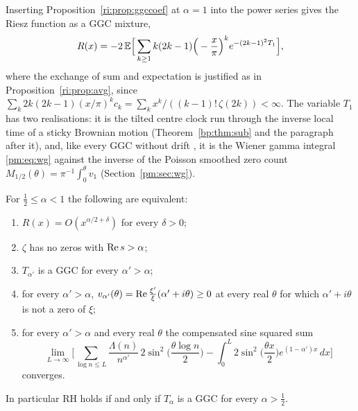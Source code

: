 Inserting Proposition~\ref{ri:prop:ggccoef} at $\alpha=1$ into the power series gives the Riesz function as a GGC mixture,
\begin{equation}\label{ri:eq:mixture}
R(x)=-2\,\mathbb{E}\Big[\sum_{k\ge1}k(2k-1)\Big(-\frac x\pi\Big)^ke^{-(2k-1)^2T_1}\Big],
\end{equation}
where the exchange of sum and expectation is justified as in Proposition~\ref{ri:prop:avg}, since $\sum_k2k(2k-1)(x/\pi)^kc_k=\sum_kx^k/((k-1)!\,\zeta(2k))<\infty$. The variable $T_1$ has two realisations: it is the tilted centre clock run through the inverse local time of a sticky Brownian motion (Theorem~\ref{bp:thm:sub} and the paragraph after it), and, like every GGC without drift \cite{JRY}, it is the Wiener gamma integral \eqref{pm:eq:wg} against the inverse of the Poisson smoothed zero count $M_{1/2}(\theta)=\pi^{-1}\int_0^\theta v_1$ (Section~\ref{pm:sec:wg}).

\begin{theorem}\label{ri:thm:ggcriesz}
For $\frac12\le\alpha<1$ the following are equivalent:
\begin{enumerate}
\item $R(x)=O(x^{\alpha/2+\delta})$ for every $\delta>0$;
\item $\zeta$ has no zeros with $\operatorname{Re} s>\alpha$;
\item $T_{\alpha'}$ is a GGC for every $\alpha'>\alpha$;
\item for every $\alpha'>\alpha$, $v_{\alpha'}(\theta)=\operatorname{Re}\frac{\xi'}\xi(\alpha'+i\theta)\ge0$ at every real $\theta$ for which $\alpha'+i\theta$ is not a zero of $\xi$;
\item for every $\alpha'>\alpha$ and every real $\theta$ the compensated sine squared sum
\[
\lim_{L\to\infty}\Big[\sum_{\log n\le L}\frac{\Lambda(n)}{n^{\alpha'}}\,2\sin^2\Big(\frac{\theta\log n}2\Big)-\int_0^L2\sin^2\Big(\frac{\theta x}2\Big)e^{(1-\alpha')x}\,dx\Big]
\]
converges.
\end{enumerate}
In particular RH holds if and only if $T_\alpha$ is a GGC for every $\alpha>\frac12$.
\end{theorem}

